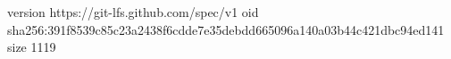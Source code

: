 version https://git-lfs.github.com/spec/v1
oid sha256:391f8539c85c23a2438f6cdde7e35debdd665096a140a03b44c421dbc94ed141
size 1119

